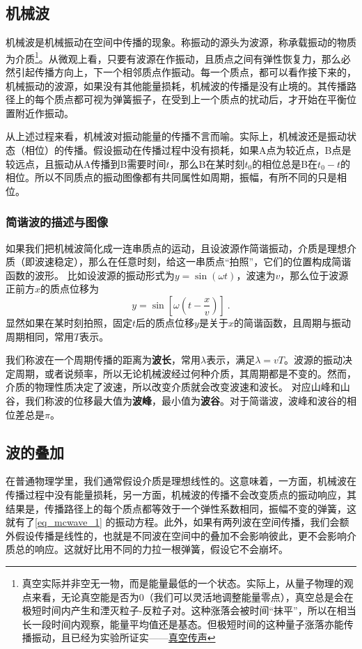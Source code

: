 \subsection{机械波}
机械波是机械振动在空间中传播的现象。称振动的源头为波源，称承载振动的物质为介质\footnote{真空实际并非空无一物，而是能量最低的一个状态。实际上，从量子物理的观点来看，无论真空能是否为0（我们可以灵活地调整能量零点），真空总是会在极短时间内产生和湮灭粒子-反粒子对。这种涨落会被时间“抹平”，所以在相当长一段时间内观察，能量平均值还是基态。但极短时间的这种量子涨落亦能传播振动，且已经为实验所证实——\href{https://www.rmzxw.com.cn/c/2023-08-25/3399291.shtml}{真空传声}}。从微观上看，只要有波源在作振动，且质点之间有弹性恢复力，那么必然引起传播方向上，下一个相邻质点作振动。每一个质点，都可以看作接下来的，机械振动的波源，如果没有其他能量损耗，机械波的传播是没有止境的。其传播路径上的每个质点都可视为弹簧振子，在受到上一个质点的扰动后，才开始在平衡位置附近作振动。

从上述过程来看，机械波对振动能量的传播不言而喻。实际上，机械波还是振动状态（相位）的传播。假设振动在传播过程中没有损耗，如果A点为较近点，B点是较远点，且振动从A传播到B需要时间$t$，那么B在某时刻$t_0$的相位总是B在$t_0-t$的相位。所以不同质点的振动图像都有共同属性如周期，振幅，有所不同的只是相位。
\subsubsection{简谐波的描述与图像}
如果我们把机械波简化成一连串质点的运动，且设波源作简谐振动，介质是理想介质（即波速稳定），那么在任意时刻，给这一串质点“拍照”，它们的位置构成简谐函数的波形。
比如设波源的振动形式为$y=\sin(\omega t)$，波速为$v$，那么位于波源正前方$x$的质点位移为
\begin{equation}\label{eq_mcwave_1}
y=\sin [\omega (t-\frac{x}{v})]~.
\end{equation}
显然如果在某时刻拍照，固定$t$后的质点位移$y$是关于$x$的简谐函数，且周期与振动周期相同，常用$T$表示。%

我们称波在一个周期传播的距离为\textbf{波长}，常用$\lambda $表示，满足$\lambda=vT$。波源的振动决定周期，或者说频率，所以无论机械波经过何种介质，其周期都是不变的。然而，介质的物理性质决定了波速，所以改变介质就会改变波速和波长。
对应山峰和山谷，我们称波的位移最大值为\textbf{波峰}，最小值为\textbf{波谷}。对于简谐波，波峰和波谷的相位差总是$\pi$。

\subsection{波的叠加}\label{sub_mcwave_1}
在普通物理学里，我们通常假设介质是理想线性的。这意味着，一方面，机械波在传播过程中没有能量损耗，另一方面，机械波的传播不会改变质点的振动响应，其结果是，传播路径上的每个质点都等效于一个弹性系数相同，振幅不变的弹簧，这就有了\autoref{eq_mcwave_1} 的振动方程。此外，如果有两列波在空间传播，我们会额外假设传播是线性的，也就是不同波在空间中的叠加不会影响彼此，更不会影响介质总的响应。这就好比用不同的力拉一根弹簧，假设它不会崩坏。

